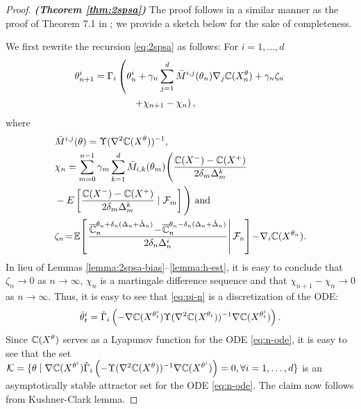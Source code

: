 \begin{proof}\textbf{\textit{(Theorem \ref{thm:2spsa})}}
The proof follows in a similar manner as the proof of Theorem 7.1 in \cite{Bhatnagar13SR}; we provide a sketch below for the sake of completeness.

We first rewrite the recursion \eqref{eq:2spsa} as follows:
For $i=1,\ldots, d$
\begin{align}
 &\theta^{i}_{n+1} = \Gamma_{i}\left(\theta^{i}_n + \gamma_n \sum_{j=1}^{d} \bar M^{i,j}(\theta_n) \nabla_{j} \mathbb{C}(X^\theta_n) + \gamma_n \zeta_n \right.\\
&\qquad\qquad\qquad\left. + \chi_{n+1} - \chi_n \right), \label{eq:pi-n}
\end{align}
where 
\begin{align*}
&\bar M^{i,j}(\theta) = \Upsilon(\nabla^2 \mathbb{C}(X^{\theta}))^{-1},\\
& \chi_n = \sum_{m=0}^{n-1} \gamma_m \sum_{k=1}^{d} {\bar{M}}_{i,k}(\theta_m)\Bigg(
\frac{\mathbb{C}(X^{-}) -
\mathbb{C}(X^{+})}{2\delta_m \Delta^k_m} 
 \\
 &- E\left[\frac{\mathbb{C}(X^{-}) -
\mathbb{C}(X^{+})}{2\delta_m \Delta^k_m} 
\mid {\cal F}_m\right]\Bigg) \text{ and}\\
&\zeta_n \!=\! \mathbb{E}\!\left[\left.\dfrac{\overline {\mathbb{C}}_n^{\theta_n + \delta_n (\Delta_n + \hat \Delta_n)} \!-\!\overline {\mathbb{C}}_n^{\theta_n - \delta_n (\Delta_n + \hat \Delta_n)}}{2 \delta_n \Delta_n^i}\right| \mathcal{F}_n \right] \!-\! \nabla_i \mathbb{C}(X^{\theta_n}).
\end{align*}
In lieu of Lemmas \ref{lemma:2spsa-bias}--\ref{lemma:h-est}, it is easy to conclude that $\zeta_n \rightarrow 0$ as $n\rightarrow \infty$, $\chi_n$ is a martingale difference sequence and that $\chi_{n+1} - \chi_n \rightarrow 0$ as $n\rightarrow \infty$. 
Thus, it is easy to see that \eqref{eq:pi-n} is a discretization of the ODE:
\begin{align}
\dot\theta^{i}_t = \check\Gamma_{i}\left(- \nabla \mathbb{C}(X^{\theta^{i}_t}) \Upsilon(\nabla^2 \mathbb{C}(X^{\theta_t}))^{-1} \nabla \mathbb{C}(X^{\theta^{i}_t}) \right).
\label{eq:n-ode}
\end{align}
Since $\mathbb{C}(X^{\theta})$ serves as a Lyapunov function for the ODE \eqref{eq:n-ode}, it is easy to see that the set \\$\mathcal{K} = \{\theta \mid
\nabla \mathbb{C}(X^{\theta^{i}})  \check\Gamma_{i}\left(-\Upsilon(\nabla^2 \mathbb{C}(X^{\theta}))^{-1} \nabla \mathbb{C}(X^{\theta^{i}})\right)
=0, \forall i=1,\ldots,d\}$ is an asymptotically stable attractor set for the ODE \eqref{eq:n-ode}. The claim now follows from Kushner-Clark lemma.
\end{proof}

